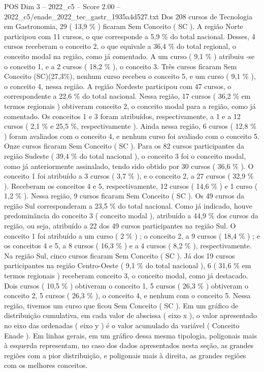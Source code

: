 \begin{textsample}{POS Dim 3 – 2022\_c5 – Score 2.00 – 2022\_c5/enade\_2022\_tec\_gastr\_1935a4d527.txt}
Dos 208 cursos de Tecnologia em Gastronomia, 29 ( 13,9 \% ) ficaram Sem Conceito ( SC ).
A região Norte participou com 11 cursos, o que corresponde a 5,9 \% do total nacional.
Desses, 4 cursos receberam o conceito 2, o que equivale a 36,4 \% do total regional, o conceito modal na região, como já comentado.
A um curso ( 9,1 \% ) atribuiu -se o conceito 1, e a 2 cursos ( 18,2 \% ), o conceito 3.
Três cursos ficaram Sem Conceito (SC)(27,3\%), nenhum curso recebeu o conceito 5, e um curso ( 9,1 \% ), o conceito 4, nessa região.
A região Nordeste participou com 47 cursos, o correspondente a 22,6 \% do total nacional.
Nessa região, 17 cursos ( 36,2 \% em termos regionais ) obtiveram conceito 2, o conceito modal para a região, como já comentado.
Os conceitos 1 e 3 foram atribuídos, respectivamente, a 1 e a 12 cursos ( 2,1 \% e 25,5 \%, respectivamente ).
Ainda nessa região, 6 cursos ( 12,8 \% ) foram avaliados com o conceito 4, e nenhum curso foi avaliado com o conceito 5.
Onze cursos ficaram Sem Conceito ( SC ).
Para os 82 cursos participantes da região Sudeste ( 39,4 \% do total nacional ), o conceito 3 foi o conceito modal, como já anteriormente assinalado, tendo sido obtido por 30 cursos ( 36,6 \% ).
O conceito 1 foi atribuído a 3 cursos ( 3,7 \% ), e o conceito 2, a 27 cursos ( 32,9 \% ).
Receberam os conceitos 4 e 5, respectivamente, 12 cursos ( 14,6 \% ) e 1 curso ( 1,2 \% ).
Nessa região, 9 cursos ficaram Sem Conceito ( SC ).
Os 49 cursos da região Sul corresponderam a 23,5 \% do total nacional.
Como já indicado, houve predominância do conceito 3 ( conceito modal ), atribuído a 44,9 \% dos cursos da região, ou seja, atribuído a 22 dos 49 cursos participantes na região Sul.
O conceito 1 foi atribuído a um curso ( 2 \% ) ; o conceito 2, a 9 cursos ( 18,4 \% ) ; e os conceitos 4 e 5, a 8 cursos ( 16,3 \% ) e a 4 cursos ( 8,2 \% ), respectivamente.
Na região Sul, cinco cursos ficaram Sem Conceito ( SC ).
Já dos 19 cursos participantes na região Centro-Oeste ( 9,1 \% do total nacional ), 6 ( 31,6 \% em termos regionais ) receberam conceito 3, o conceito modal, como já destacado.
Dois cursos ( 10,5 \% ) obtiveram o conceito 1, 5 cursos ( 26,3 \% ) obtiveram o conceito 2, 5 cursos ( 26,3 \% ), o conceito 4, e nenhum com o conceito 5.
Nessa região, tivemos um curso que ficou Sem Conceito ( SC ).
Em um gráfico de distribuição cumulativa, em cada valor de abscissa ( eixo x ), o valor apresentado no eixo das ordenadas ( eixo y ) é o valor acumulado da variável ( Conceito Enade ).
Em linhas gerais, em um gráfico dessa mesma tipologia, poligonais mais à esquerda representam, no caso dos dados apresentados nesta seção, as grandes regiões com a pior distribuição, e poligonais mais à direita, as grandes regiões com os melhores conceitos.

\end{textsample}
